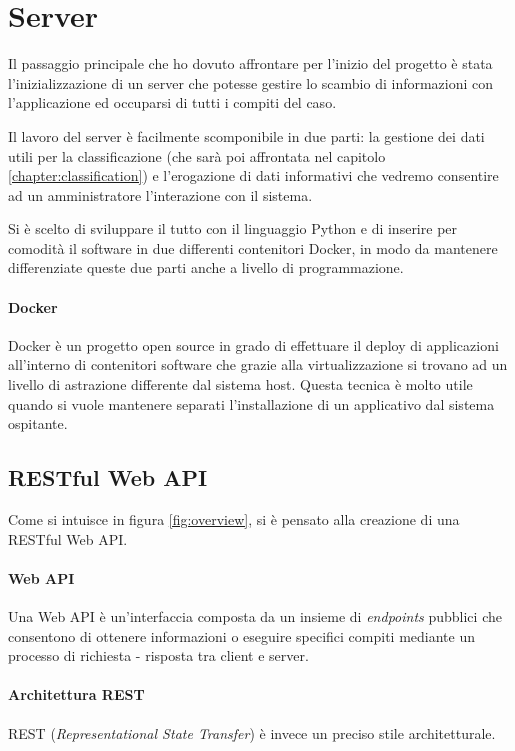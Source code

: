 \chapter{Server}
Il passaggio principale che ho dovuto affrontare per l'inizio del progetto è stata l'inizializzazione
di un server che potesse gestire lo scambio di informazioni con l'applicazione ed occuparsi di tutti i compiti del caso.

Il lavoro del server è facilmente scomponibile in due parti: la gestione dei dati utili per la classificazione 
(che sarà poi affrontata nel capitolo \ref{chapter:classification}) e l'erogazione di dati informativi che vedremo consentire
ad un amministratore l'interazione con il sistema.

Si è scelto di sviluppare il tutto con il linguaggio Python e di inserire per comodità il software in due differenti contenitori Docker, in modo da 
mantenere differenziate queste due parti anche a livello di programmazione.

\subsubsection{Docker}
Docker \cite{docker} è un progetto open source in grado di effettuare il deploy di applicazioni all'interno di contenitori software che grazie alla
virtualizzazione si trovano ad un livello di astrazione differente dal sistema host. Questa tecnica è molto utile quando si vuole
mantenere separati l'installazione di un applicativo dal sistema ospitante.



\section{RESTful Web API}
\label{section:api}
Come si intuisce in figura \ref{fig:overview}, si è pensato alla creazione di una RESTful Web API.

\subsubsection{Web API}
Una Web API è un'interfaccia composta da un insieme di \textit{endpoints} pubblici che consentono di ottenere informazioni 
o eseguire specifici compiti mediante un processo di richiesta - risposta tra client e server. 

\subsubsection{Architettura REST}
REST (\textit{Representational State Transfer}) è invece un preciso stile architetturale. 

